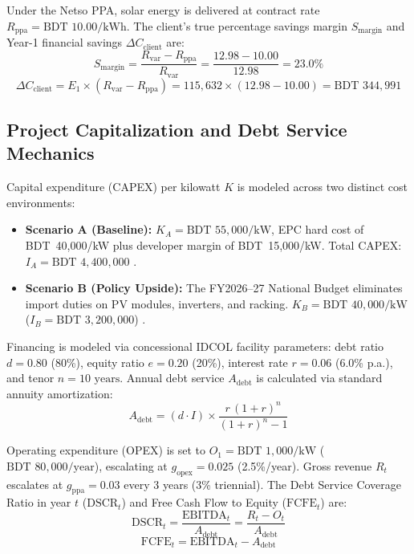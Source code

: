 \documentclass[11pt,a4paper]{article}
\begin{document}
Under the Netso PPA, solar energy is delivered at contract rate $R_{\text{ppa}} = \text{BDT } 10.00\text{/kWh}$. The client's true percentage savings margin $S_{\text{margin}}$ and Year-1 financial savings $\Delta C_{\text{client}}$ are:
\begin{equation}
S_{\text{margin}} = \frac{R_{\text{var}} - R_{\text{ppa}}}{R_{\text{var}}} = \frac{12.98 - 10.00}{12.98} = 23.0\%
\label{eq:savings_margin}
\end{equation}
\begin{equation}
\Delta C_{\text{client}} = E_1 \times (R_{\text{var}} - R_{\text{ppa}}) = 115,632 \times (12.98 - 10.00) = \text{BDT } 344,991
\label{eq:savings_annual}
\end{equation}

\subsection{Project Capitalization and Debt Service Mechanics}
Capital expenditure (CAPEX) per kilowatt $K$ is modeled across two distinct cost environments:
\begin{itemize}
    \item \textbf{Scenario A (Baseline):} $K_A = \text{BDT } 55{,}000\text{/kW}$, EPC hard cost of BDT~40,000/kW plus developer margin of BDT~15,000/kW. Total CAPEX: $I_A = \text{BDT } 4{,}400{,}000$ \cite{gt_constants}.
    \item \textbf{Scenario B (Policy Upside):} The FY2026--27 National Budget eliminates import duties on PV modules, inverters, and racking. $K_B = \text{BDT } 40{,}000\text{/kW}$ ($I_B = \text{BDT } 3{,}200{,}000$) \cite{gt_constants}.
\end{itemize}

Financing is modeled via concessional IDCOL facility parameters: debt ratio $d = 0.80$ (80\%), equity ratio $e = 0.20$ (20\%), interest rate $r = 0.06$ (6.0\% p.a.), and tenor $n = 10\text{ years}$. Annual debt service $A_{\text{debt}}$ is calculated via standard annuity amortization:
\begin{equation}
A_{\text{debt}} = (d \cdot I) \times
  \frac{r\,(1+r)^{n}}{(1+r)^{n} - 1}
\label{eq:debt_service}
\end{equation}

Operating expenditure (OPEX) is set to $O_1 = \text{BDT } 1,000\text{/kW}$ ($\text{BDT } 80,000\text{/year}$), escalating at $g_{\text{opex}} = 0.025$ (2.5\%/year). Gross revenue $R_t$ escalates at $g_{\text{ppa}} = 0.03$ every 3 years (3\% triennial). The Debt Service Coverage Ratio in year $t$ ($\text{DSCR}_t$) and Free Cash Flow to Equity ($\text{FCFE}_t$) are:
\begin{equation}
\text{DSCR}_t = \frac{\text{EBITDA}_t}{A_{\text{debt}}} = \frac{R_t - O_t}{A_{\text{debt}}}
\label{eq:dscr}
\end{equation}
\begin{equation}
\text{FCFE}_t = \text{EBITDA}_t - A_{\text{debt}}
\label{eq:fcfe}
\end{equation}
\end{document}
